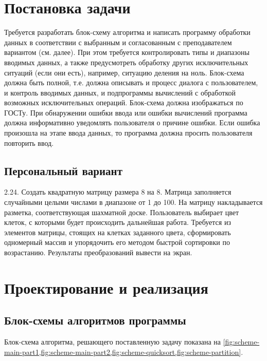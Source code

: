 \documentclass[14pt, a4paper]{extreport}
\begin{document}
\chapter{Постановка задачи}
Требуется разработать блок-схему алгоритма и написать программу обработки данных в соответствии с выбранным и согласованным с преподавателем вариантом (см. далее). При этом требуется контролировать типы и диапазоны вводимых данных, а также предусмотреть обработку других исключительных ситуаций (если они есть), например, ситуацию деления на ноль. Блок-схема должна быть полной, т.е. должна описывать и процесс диалога с пользователем, и контроль вводимых данных, и подпрограммы вычислений с обработкой возможных исключительных операций. Блок-схема должна изображаться по ГОСТу. При обнаружении ошибки ввода или ошибки вычислений программа должна информативно уведомлять пользователя о причине ошибки. Если ошибка произошла на этапе ввода данных, то программа должна просить пользователя повторить ввод.

\section{Персональный вариант}
2.24. Создать квадратную матрицу размера 8 на 8. Матрица заполняется случайными целыми числами в диапазоне от 1 до 100. На матрицу накладывается разметка, соответствующая шахматной доске. Пользователь выбирает цвет клеток, с которыми будет происходить дальнейшая работа. Требуется из элементов матрицы, стоящих на клетках заданного цвета, сформировать одномерный массив и упорядочить его методом быстрой сортировки по возрастанию. Результаты преобразований вывести на экран.

\chapter{Проектирование и реализация}
\section{Блок-схемы алгоритмов программы}
Блок-схема алгоритма, решающего поставленную задачу показана на \cref{fig:scheme-main-part1,fig:scheme-main-part2,fig:scheme-quicksort,fig:scheme-partition}.
\end{document}
